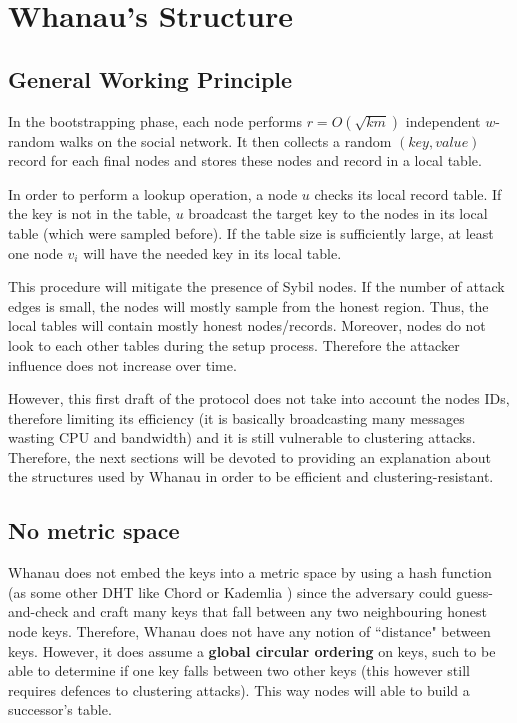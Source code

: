 \section{Whanau's Structure \label{struct}}

\subsection{General Working Principle}

In the bootstrapping phase, each node performs $r=O(\sqrt{km})$ independent $w$-random walks on the social network. It then collects a random $(key, value)$ record for each final nodes and stores these nodes and record in a local table.

In order to perform a lookup operation, a node $u$ checks its local record table. If the key is not in the table, $u$ broadcast the target key to the nodes in its local table (which were sampled before). If the table size is sufficiently large, at least one node $v_i$ will have the needed key in its local table. 

This procedure will mitigate the presence of Sybil nodes. If the number of attack edges is small, the nodes will mostly sample from the honest region. Thus, the local tables will contain mostly honest nodes/records. Moreover, nodes do not look to each other tables during the setup process. Therefore the attacker influence does not increase over time.

However, this first draft of the protocol does not take into account the nodes IDs, therefore limiting its efficiency (it is basically broadcasting many messages wasting CPU and bandwidth) and it is still vulnerable to clustering attacks. Therefore, the next sections will be devoted to providing an explanation about the structures used by Whanau in order to be efficient and clustering-resistant.

\subsection{No metric space} Whanau does not embed the keys into a metric space by using a hash function (as some other DHT like Chord \cite{stoica2001chord} or Kademlia \cite{maymounkov2002kademlia}) since the adversary could guess-and-check and craft many keys that fall between any two neighbouring honest node keys. Therefore, Whanau does not have any notion of ``distance" between keys. However, it does assume a \textbf{global circular ordering} on keys, such to be able to determine if one key falls between two other keys (this however still requires defences to clustering attacks). This way nodes will able to build a successor's table. 

